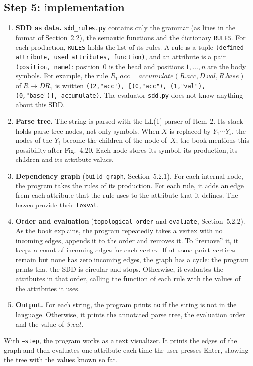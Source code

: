 \documentclass[11pt,a4paper]{article}
\newcommand{\code}[1]{\texttt{#1}}
\begin{document}
\subsection{Step 5: implementation}

\begin{enumerate}
  \item \textbf{SDD as data.} \code{sdd\_rules.py} contains only the grammar (as lines in the format of
  Section~2.2), the semantic functions and the dictionary \code{RULES}. For each production,
  \code{RULES} holds the list of its rules. A rule is a tuple
  \code{(defined attribute, used attributes, function)}, and an attribute is a pair
  \code{(position, name)}: position~0 is the head and positions $1,\dots,n$ are the body symbols. For example, the rule
  $R_1.acc = accumulate(R.acc, D.val, R.base)$ of $R \to DR_1$ is written
  \code{((2,"acc"), [(0,"acc"), (1,"val"), (0,"base")], accumulate)}. The evaluator \code{sdd.py} does not know
  anything about this SDD.
  \item \textbf{Parse tree.} The string is parsed with the LL(1) parser of Item~2. Its stack holds parse-tree nodes, not only symbols. When $X$ is replaced by $Y_1 \cdots Y_k$, the nodes of the $Y_i$ become the children of the node of~$X$; the book mentions this possibility after Fig.~4.20. Each node stores its symbol, its production, its children and its attribute values.
  \item \textbf{Dependency graph} (\code{build\_graph}, Section~5.2.1). For each internal node, the program takes the rules of its production. For each rule, it adds an edge from each attribute that the rule uses to the attribute that it defines. The leaves provide their \code{lexval}.
  \item \textbf{Order and evaluation} (\code{topological\_order} and \code{evaluate}, Section~5.2.2). As the book explains, the program repeatedly takes a vertex with no incoming edges, appends it to the order and removes it. To ``remove'' it, it keeps a count of incoming edges for each vertex. If at some point vertices remain but none has zero incoming edges, the graph has a cycle: the program prints that the SDD is circular and stops. Otherwise, it evaluates the attributes in that order, calling the function of each rule with the values of the attributes it uses.
  \item \textbf{Output.} For each string, the program prints \code{no} if the string is not in the language. Otherwise, it prints the annotated parse tree, the evaluation order and the value of $S.val$.
\end{enumerate}
With \code{--step}, the program works as a text visualizer. It prints the edges of the graph and then evaluates one attribute each time the user presses Enter, showing the tree with the values known so far.
\end{document}
